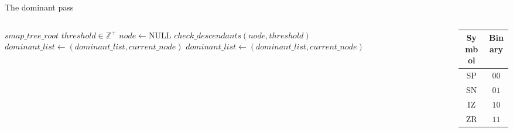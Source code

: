 \documentclass{beamer}
\begin{document}
\begin{frame}{The dominant pass}
    \begin{columns}
        \begin{column}{0.8\textwidth}
            \begin{algorithm}[H]
                \caption{Dominant pass}
                \label{alg:dompass}
                \scriptsize
                \begin{algorithmic}
                    \Require $smap\_tree\_root$ 
                    \Require $threshold \in \mathbb{Z}^+$
                    \State $node \gets \text{NULL}$
                        \State $check\_descendants(node, threshold)$
                            \State $dominant\_list \gets (dominant\_list, current\_node)$
                                \State $dominant\_list \gets (dominant\_list, current\_node)$
                            \EndIf
                        \EndIf
                    \EndFor
                \end{algorithmic}
            \end{algorithm}
        \end{column}
        \begin{column}{0.2\textwidth}
            \begin{table}[H]
                \centering
                \scriptsize
                \begin{tabular}{|c|c|}
                    \hline
                    \textbf{Symbol} & \textbf{Binary}\\
                    \hline
                    SP & $00$\\
                    SN & $01$\\
                    IZ & $10$\\
                    ZR & $11$\\
                    \hline
                \end{tabular}
            \end{table}
        \end{column}
    \end{columns}
\end{frame}
\end{document}
